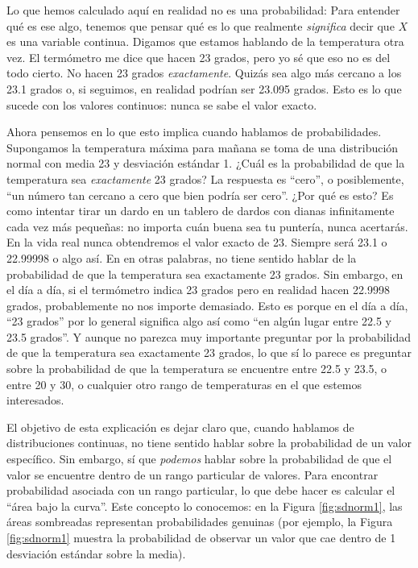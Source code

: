 \documentclass[spanish,]{book}
\begin{document}
Lo que hemos calculado aquí en realidad no es una probabilidad: Para
entender qué es ese algo, tenemos que pensar qué es lo que realmente
\emph{significa} decir que \(X\) es una variable continua. Digamos que
estamos hablando de la temperatura otra vez. El termómetro me dice que
hacen 23 grados, pero yo sé que eso no es del todo cierto. No hacen 23
grados \emph{exactamente}. Quizás sea algo más cercano a los 23.1 grados
o, si seguimos, en realidad podrían ser 23.095 grados. Esto es lo que
sucede con los valores continuos: nunca se sabe el valor exacto.

Ahora pensemos en lo que esto implica cuando hablamos de probabilidades.
Supongamos la temperatura máxima para mañana se toma de una distribución
normal con media 23 y desviación estándar 1. ¿Cuál es la probabilidad de
que la temperatura sea \emph{exactamente} 23 grados? La respuesta es
``cero'', o posiblemente, ``un número tan cercano a cero que bien podría
ser cero''. ¿Por qué es esto? Es como intentar tirar un dardo en un
tablero de dardos con dianas infinitamente cada vez más pequeñas: no
importa cuán buena sea tu puntería, nunca acertarás. En la vida real
nunca obtendremos el valor exacto de 23. Siempre será 23.1 o 22.99998 o
algo así. En en otras palabras, no tiene sentido hablar de la
probabilidad de que la temperatura sea exactamente 23 grados. Sin
embargo, en el día a día, si el termómetro indica 23 grados pero en
realidad hacen 22.9998 grados, probablemente no nos importe demasiado.
Esto es porque en el día a día, ``23 grados'' por lo general significa
algo así como ``en algún lugar entre 22.5 y 23.5 grados''. Y aunque no
parezca muy importante preguntar por la probabilidad de que la
temperatura sea exactamente 23 grados, lo que sí lo parece es preguntar
sobre la probabilidad de que la temperatura se encuentre entre 22.5 y
23.5, o entre 20 y 30, o cualquier otro rango de temperaturas en el que
estemos interesados.

El objetivo de esta explicación es dejar claro que, cuando hablamos de
distribuciones continuas, no tiene sentido hablar sobre la probabilidad
de un valor específico. Sin embargo, sí que \emph{podemos} hablar sobre
la probabilidad de que el valor se encuentre dentro de un rango
particular de valores. Para encontrar probabilidad asociada con un rango
particular, lo que debe hacer es calcular el ``área bajo la curva''.
Este concepto lo conocemos: en la Figura \ref{fig:sdnorm1}, las áreas
sombreadas representan probabilidades genuinas (por ejemplo, la Figura
\ref{fig:sdnorm1} muestra la probabilidad de observar un valor que cae
dentro de 1 desviación estándar sobre la media).
\end{document}
